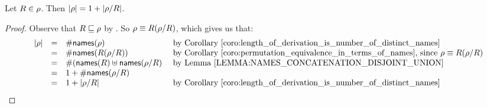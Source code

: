 
\begin{lemma}
Let $R \in \rho$. Then $|\rho| = 1 + |\rho/R|$.
\end{lemma}
\begin{proof}
Observe that $R \sqsubseteq \rho$ by .
So $\rho \equiv R(\rho/R)$, which gives us that:
\[
  \begin{array}{rcll}
  \lengthof{\redseq} & = & \#\names(\redseq) & \text{ by \rcoro{length_of_derivation_is_number_of_distinct_names}} \\
                     & = & \#\names(\redex(\redseq/\redex)) & \text{ by \rcoro{permutation_equivalence_in_terms_of_names}, since $\redseq \permeq \redex(\redseq/\redex)$} \\
                     & = & \#(\names(\redex) \uplus \names(\redseq/\redex) & \text{ by \rlem{names_concatenation_disjoint_union}} \\
                     & = & 1 + \#\names(\redseq/\redex) \\
                     & = & 1 + \lengthof{\redseq/\redex} & \text{ by \rcoro{length_of_derivation_is_number_of_distinct_names}} \\
  \end{array}
\]
\end{proof}


